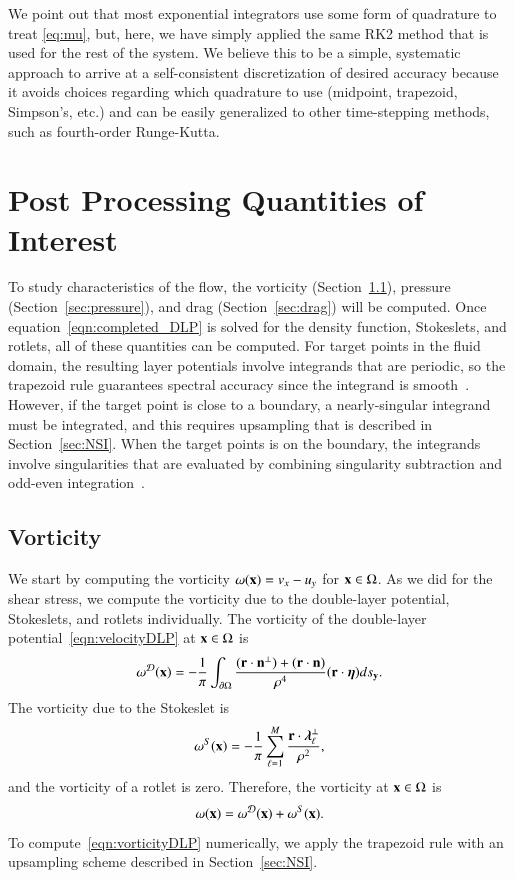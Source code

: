 \documentclass[preprint, 10pt]{elsarticle}
\begin{document}
We point out that most exponential integrators use some form of quadrature to treat \eqref{eq:mu}, but, here, we have simply applied the same RK2 method that is used for the rest of the system. We believe this to be a simple, systematic approach to arrive at a self-consistent discretization of desired accuracy because it avoids choices regarding which quadrature to use (midpoint, trapezoid, Simpson's, etc.) and can be easily generalized to other time-stepping methods, such as fourth-order Runge-Kutta. 


\section{Post Processing Quantities of Interest}
\label{s:qoi}
To study characteristics of the flow, the vorticity
(Section~\ref{sec:vorticity}), pressure (Section~\ref{sec:pressure}),
and drag (Section~\ref{sec:drag}) will be computed.  Once
equation~\eqref{eqn:completed_DLP} is solved for the density function,
Stokeslets, and rotlets, all of these quantities can be computed.  For
target points in the fluid domain, the resulting layer potentials
involve integrands that are periodic, so the trapezoid rule guarantees
spectral accuracy since the integrand is smooth~\cite{tre-wei2014}.
However, if the target point is close to a boundary, a nearly-singular
integrand must be integrated, and this requires upsampling that is
described in Section~\ref{sec:NSI}.  When the target points is on the
boundary, the integrands involve singularities that are evaluated by
combining singularity subtraction and odd-even
integration~\cite{sid-isr1988}.  



\subsection{Vorticity}
\label{sec:vorticity}
We start by computing the vorticity $\omega({\mathbf{x}}) = v_x - u_y$ for ${\mathbf{x}} \in
\Omega$.  As we did for the shear stress, we compute the vorticity due
to the double-layer potential, Stokeslets, and rotlets individually.
The vorticity of the double-layer potential~\eqref{eqn:velocityDLP} at
${\mathbf{x}} \in \Omega$ is
\begin{align}
  \omega^{{\mathcal{D}}}({\mathbf{x}}) = -\frac{1}{\pi}\int_{{\partial}\Omega} 
    \frac{({\mathbf{r}} \cdot {\mathbf{n}}^\perp) + ({\mathbf{r}} \cdot {\mathbf{n}})}{\rho^4}
    ({\mathbf{r}} \cdot {\boldsymbol\eta}) ds_{{\mathbf{y}}}.
  \label{eqn:vorticityDLP}
\end{align}
The vorticity due to the Stokeslet is
\begin{align*}
  \omega^S({\mathbf{x}}) = -\frac{1}{\pi} \sum_{\ell=1}^{M} 
    \frac{{\mathbf{r}} \cdot {\boldsymbol\lambda}_\ell^\perp}{\rho^2},
\end{align*}
and the vorticity of a rotlet is zero.  Therefore, the vorticity at ${\mathbf{x}}
\in \Omega$ is
\begin{align*}
  \omega({\mathbf{x}}) = \omega^{\mathcal{D}}({\mathbf{x}}) + \omega^S({\mathbf{x}}).
\end{align*}
To compute~\eqref{eqn:vorticityDLP} numerically, we apply the trapezoid
rule with an upsampling scheme described in Section~\ref{sec:NSI}.
\end{document}
